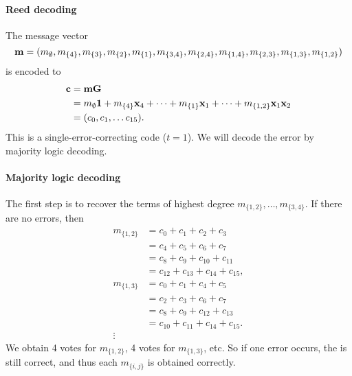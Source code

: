 \documentclass[a4paper, 11pt, openany]{book}
\begin{document}
\paragraph{Reed decoding}
The message vector
\[
	{\bf m} = (m_\emptyset, m_{\{4\}}, m_{\{3\}}, m_{\{2\}}, m_{\{1\}}, m_{\{3,4\}}, m_{\{2,4\}}, m_{\{1,4\}}, m_{\{2,3\}}, m_{\{1,3\}}, m_{\{1,2\}})
\]
is encoded to
\begin{align*}
	{\bf c} &= {\bf m} {\bf G}\\
	&= m_\emptyset {\bf 1} + m_{\{4\}} {\bf x}_4 + \dots + m_{\{1\}} {\bf x}_1 + \dots + m_{\{1,2\}} {\bf x}_1 {\bf x}_2\\
	&= (c_0, c_1, \dots c_{15}).
\end{align*}
This is a single-error-correcting code ($t=1$). We will decode the error by majority logic decoding.


\paragraph{Majority logic decoding}
The first step is to recover the terms of highest degree $m_{\{1,2\}}, \dots, m_{\{3,4\}}$. If there are no errors, then
\begin{align*}
	m_{\{1,2\}} &= c_0 + c_1 + c_2 + c_3\\
	&= c_4 + c_5 + c_6 + c_7\\
	&= c_8 + c_9 + c_{10} + c_{11}\\
	&= c_{12} + c_{13} + c_{14} + c_{15},\\
	m_{\{1,3\}} &= c_0 + c_1 + c_4 + c_5\\
	&= c_2 + c_3 + c_6 + c_7\\
	&= c_8 + c_9 + c_{12} + c_{13}\\
	&= c_{10} + c_{11} + c_{14} + c_{15}.\\
	\vdots
\end{align*}
We obtain 4 votes for $m_{\{ 1,2 \}}$, 4 votes for $m_{ \{ 1,3 \} }$, etc. So if one error occurs, the  is still correct, and thus each $m_{\{ i,j \}}$ is obtained correctly.
\end{document}
